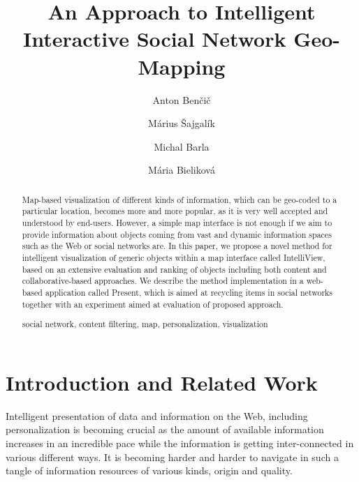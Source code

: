 \documentclass{llncs}
\begin{document}
%

\title{An Approach to Intelligent Interactive Social Network Geo-Mapping}
%
%
\author{Anton Benčič \and Márius Šajgalík \and Michal Barla \and Mária Bieliková }
%
%

\maketitle            

\begin{abstract}
Map-based visualization of different kinds of information, which can be geo-coded to a particular location, becomes more and more popular, as it is very well accepted and understood by end-users. However, a simple map interface is not enough if we aim to provide information about objects coming from vast and dynamic information spaces such as the Web or social networks are. In this paper, we propose a novel method for intelligent visualization of generic objects within a map interface called IntelliView, based on an extensive evaluation and ranking of objects including both content and collaborative-based approaches. We describe the method implementation in a web-based application called Present, which is aimed at recycling items in social networks together with an experiment aimed at evaluation of proposed approach.

\begin{keywords}
social network, content filtering, map, personalization, visualization
\end{keywords}

\end{abstract}

\section{Introduction and Related Work}

Intelligent presentation of data and information on the Web, including personalization is becoming crucial as the amount of available information increases in an incredible pace while the information is getting inter-connected in various different ways. It is becoming harder and harder to navigate in such a tangle of information resources of various kinds, origin and quality.
\end{document}
